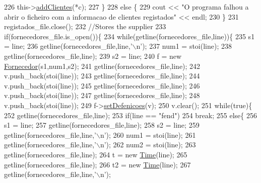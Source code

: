 \begin{DoxyCode}
226                 this->\hyperlink{classEmpresa_a57597ec4154f274686bc648ccf5d2a59}{addClientes}(*c);
227             \}
228         \textcolor{keywordflow}{else} \{
229             cout << \textcolor{stringliteral}{"O programa falhou a abrir o ficheiro com a informacao de clientes registados"} << endl;
230         \}
231     registados\_file.close();
232    \textcolor{comment}{//Stores the supplier}
233     \textcolor{keywordflow}{if}(fornecedores\_file.is\_open())\{
234             \textcolor{keywordflow}{while}(getline(fornecedores\_file,line))\{
235                 s1 = line;
236                 getline(fornecedores\_file,line,\textcolor{charliteral}{'\(\backslash\)n'});
237                 num1 = stoi(line);
238                 getline(fornecedores\_file,line);
239                 s2 = line;
240                 f = \textcolor{keyword}{new} \hyperlink{classFornecedor}{Fornecedor}(s1,num1,s2);
241                 getline(fornecedores\_file,line);
242                 v.push\_back(stoi(line));
243                 getline(fornecedores\_file,line);
244                 v.push\_back(stoi(line));
245                 getline(fornecedores\_file,line);
246                 v.push\_back(stoi(line));
247                 getline(fornecedores\_file,line);
248                 v.push\_back(stoi(line));
249                 f->\hyperlink{classFornecedor_a63bb5795c45d195995de437620503d98}{setDefenicoes}(v);
250                 v.clear();
251                 \textcolor{keywordflow}{while}(\textcolor{keyword}{true})\{
252                     getline(fornecedores\_file,line);
253                     \textcolor{keywordflow}{if}(line == \textcolor{stringliteral}{"fend"})
254                         \textcolor{keywordflow}{break};
255                     \textcolor{keywordflow}{else}\{
256                         s1 = line;
257                         getline(fornecedores\_file,line);
258                         s2 = line;
259                         getline(fornecedores\_file,line,\textcolor{charliteral}{'\(\backslash\)n'});
260                         num1 = stoi(line);
261                         getline(fornecedores\_file,line,\textcolor{charliteral}{'\(\backslash\)n'});
262                         num2 = stoi(line);
263                         getline(fornecedores\_file,line);
264                         t = \textcolor{keyword}{new} \hyperlink{classTime}{Time}(line);
265                         getline(fornecedores\_file,line);
266                         t2 = \textcolor{keyword}{new} \hyperlink{classTime}{Time}(line);
267                         getline(fornecedores\_file,line,\textcolor{charliteral}{'\(\backslash\)n'});

\end{DoxyCode}
